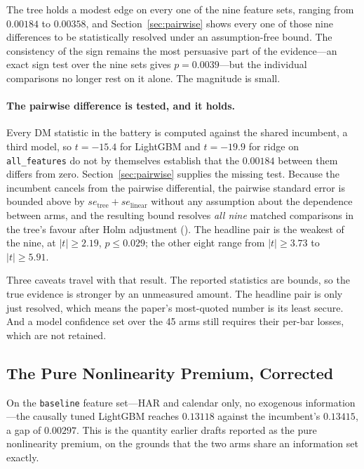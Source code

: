 The tree holds a modest edge on every one of the nine feature sets, ranging
from $0.00184$ to $0.00358$, and Section~\ref{sec:pairwise} shows every one of
those nine differences to be statistically resolved under an assumption-free
bound. The consistency of the sign remains the most persuasive part of the
evidence---an exact sign test over the nine sets gives $p = 0.0039$---but the
individual comparisons no longer rest on it alone. The magnitude is small.

\paragraph{The pairwise difference is tested, and it holds.} Every DM statistic
in the battery is computed against the shared incumbent, a third model, so
$t = -15.4$ for LightGBM and $t = -19.9$ for ridge on \texttt{all\_features} do
not by themselves establish that the $0.00184$ between them differs from zero.
Section~\ref{sec:pairwise} supplies the missing test. Because the incumbent
cancels from the pairwise differential, the pairwise standard error is bounded
above by $se_{\mathrm{tree}} + se_{\mathrm{linear}}$ without any assumption
about the dependence between arms, and the resulting bound resolves
\emph{all nine} matched comparisons in the tree's favour after Holm adjustment
(). The headline pair is the weakest of the
nine, at $|t| \ge 2.19$, $p \le 0.029$; the other eight range from
$|t| \ge 3.73$ to $|t| \ge 5.91$.

Three caveats travel with that result. The reported statistics are bounds, so
the true evidence is stronger by an unmeasured amount. The headline pair is
only just resolved, which means the paper's most-quoted number is its least
secure. And a model confidence set over the 45 arms still requires their
per-bar losses, which are not retained.

\subsection{The Pure Nonlinearity Premium, Corrected}
\label{sec:premium}

On the \texttt{baseline} feature set---HAR and calendar only, no exogenous
information---the causally tuned LightGBM reaches $0.13118$ against the
incumbent's $0.13415$, a gap of $0.00297$. This is the quantity earlier drafts
reported as the pure nonlinearity premium, on the grounds that the two arms
share an information set exactly.


